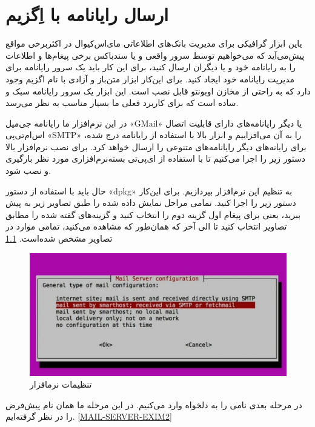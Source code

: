 \chapter{ارسال رایانامه با اِگزیم 
    }
یاین ابزار گرافیکی برای مدیریت بانک‌های اطلاعاتی مای‌اس‌کیوال در اکثربرخی مواقع پیش‌می‌آید که می‌خواهیم توسط سرور واقعی و یا سند‌باکس برخی پیغام‌ها و اطلاعات را به رایانامه خود و یا دیگران ارسال کنید، برای این کار باید یک سرور رایانامه برای مدیریت رایانامه خود ایجاد کنید. برای این‌کار ابزار متن‌باز و آزادی با نام اگزیم وجود دارد که به راحتی از مخازن اوبونتو قابل نصب است. این ابزار یک سرور رایانامه سبک و ساده است که برای کاربرد فعلی ما بسیار مناسب به نظر می‌رسد.

در این نرم‌افزار ما رایانامه جی‌میل «GMail» یا دیگر رایانامه‌های دارای قابلیت اتصال اس‌ام‌تی‌پی «SMTP» را به آن می‌افزاییم و ابزار بالا با استفاده از رایانامه درج شده، برای رایانه‌های دیگر رایانامه‌های متنوعی را ارسال خواهد کرد. برای نصب نرم‌افزار بالا دستور زیر را اجرا می‌کنیم تا با استفاده از ای‌پی‌تی بسته‌نرم‌افزاری مورد نظر بارگیری و نصب شود.
\newline
\begin{latin}  
    
\end{latin}
حال باید با استفاده از دستور «dpkg» به تنظیم این نرم‌افزار بپردازیم. برای این‌کار دستور زیر را اجرا کنید.
تمامی مراحل نمایش داده شده را طبق تصاویر زیر به پیش ببرید، یعنی برای پیغام اول گزینه دوم را انتخاب کنید و  گزینه‌های گفته شده را مطابق تصاویر انتخاب کنید تا الی آخر که  همان‌طور که مشاهده می‌کنید، تمامی موارد در تصاویر مشخص شده‌است. \ref{MAIL-SERVER-EXIM}
\begin{figure}
    \includegraphics[width=.9\textwidth ,height=.45\textwidth]{Pic/EXIM1}
    \caption{ تنظیمات نرمافزار 
    }
    \label{MAIL-SERVER-EXIM}
\end{figure}
در مرحله بعدی نامی را به دلخواه وارد می‌کنیم. در این مرحله ما همان نام پیش‌فرض را در نظر گرفته‌ایم. \ref{MAIL-SERVER-EXIM2}
